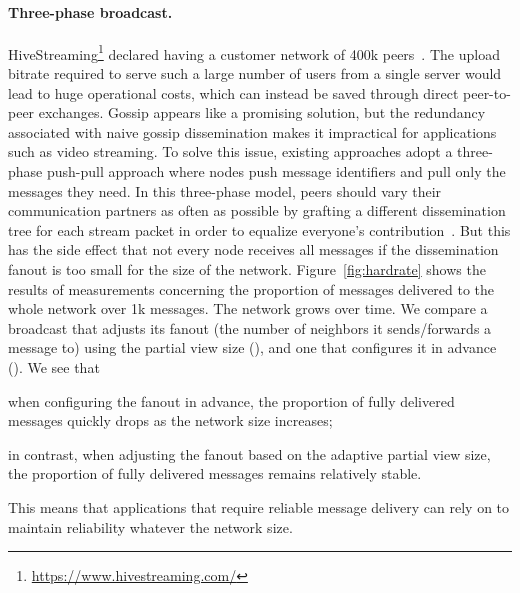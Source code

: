 \paragraph{Three-phase broadcast.}
HiveStreaming\footnote{\url{https://www.hivestreaming.com/}} declared
having a customer network of 400k peers~\cite{smoothcache2}. The
upload bitrate required to serve such a large number of users from a
single server would lead to huge operational costs, which can instead
be saved through direct peer-to-peer exchanges. Gossip appears like a
promising solution, but the redundancy associated with naive gossip
dissemination makes it impractical for applications such as video
streaming.  To solve this issue, existing approaches adopt a
three-phase push-pull approach where nodes push message identifiers
and pull only the messages they need. In this three-phase model, peers
should vary their communication partners as often as possible by
grafting a different dissemination tree for each stream packet in
order to equalize everyone's contribution~\cite{Frey09DSN}. But this
has the side effect that not every node receives all messages if the
dissemination fanout is too small for the size of the network.
Figure~\ref{fig:hardrate} shows the results of measurements concerning
the proportion of messages delivered to the whole network over 1k
messages. The network grows over time. We compare a broadcast that
adjusts its fanout (the number of neighbors it sends/forwards a
message to) using the partial view size (\SPRAY), and one that
configures it in advance (\CYCLON). We see that
\begin{inparaenum}
\item when configuring the fanout in advance, the proportion of fully
  delivered messages quickly drops as the network size increases;
\item in contrast, when adjusting the fanout based on the adaptive
  partial view size, the proportion of fully delivered messages remains
  relatively stable.
\end{inparaenum}
This means that applications that require reliable message delivery
can rely on \SPRAY to maintain reliability whatever the network size.


